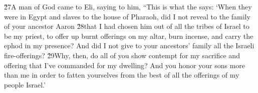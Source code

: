 \v{27}A man of God came to Eli, saying to him, ``This is what the  says: `When they were in Egypt and slaves to the house of Pharaoh, did I not reveal to the family of your ancestor Aaron \v{28}that I had chosen him out of all the tribes of Israel to be my priest, to offer up burnt offerings on my altar, burn incense, and carry the ephod in my presence? And did I not give to your ancestors' family all the Israeli fire-offerings? \v{29}Why, then, do all of you show contempt for my sacrifice and offering that I've commanded for my dwelling? And you honor your sons more than me in order to fatten yourselves from the best of all the offerings of my people Israel.'

